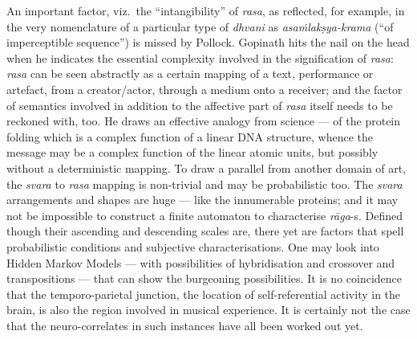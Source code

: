 An important factor, viz.\ the “intangibility” of \textsl{rasa}, as reflected, for example, in the very nomenclature of a particular type of \textsl{dhvani} as \textsl{asaṁlakṣya-krama} (“of imperceptible sequence”) is missed by Pollock. Gopinath hits the nail on the head when he indicates the essential complexity involved in the signification of \textsl{rasa}: \textsl{rasa} can be seen abstractly as a certain mapping of a text, performance or artefact, from a creator/actor, through a medium onto a receiver; and the factor of semantics involved in addition to the affective part of \textsl{rasa} itself needs to be reckoned with, too. He draws an effective analogy from science --- of the protein folding which is a complex function of a linear DNA structure, whence the message may be a complex function of the linear atomic units, but possibly without a deterministic mapping. To draw a parallel from another domain of art, the \textsl{svara} to \textsl{rasa} mapping is non-trivial and may be probabilistic too. The \textsl{svara} arrangements and shapes are huge --- like the innumerable proteins; and it may not be impossible to construct a finite automaton to characterise \textsl{rāga}-s. Defined though their ascending and descending scales are, there yet are factors that spell probabilistic conditions and subjective characterisations. One may look into Hidden Markov Models --- with possibilities of hybridisation and crossover and transpositions --- that can show the burgeoning possibilities. It is no coincidence that the temporo-parietal junction, the location of self-referential activity in the brain, is also the region involved in musical experience. It is certainly not the case that the neuro-correlates in such instances have all been worked out yet.

